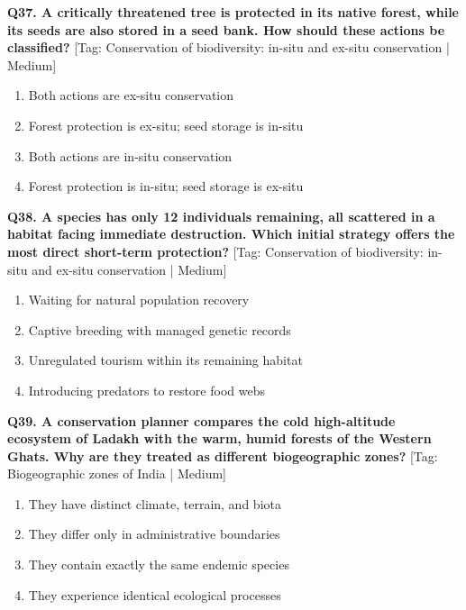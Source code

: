 \noindent\textbf{Q37. A critically threatened tree is protected in its native forest, while its seeds are also stored in a seed bank. How should these actions be classified?} \hfill [Tag: Conservation of biodiversity: in-situ and ex-situ conservation | Medium]
\begin{enumerate}[label=(\alph*),topsep=2pt,itemsep=1pt,partopsep=0pt,parsep=0pt]
    \item {Both actions are ex-situ conservation}
    \item {Forest protection is ex-situ; seed storage is in-situ}
    \item {Both actions are in-situ conservation}
    \item {Forest protection is in-situ; seed storage is ex-situ}
\end{enumerate}
\vspace{2mm}

\noindent\textbf{Q38. A species has only 12 individuals remaining, all scattered in a habitat facing immediate destruction. Which initial strategy offers the most direct short-term protection?} \hfill [Tag: Conservation of biodiversity: in-situ and ex-situ conservation | Medium]
\begin{enumerate}[label=(\alph*),topsep=2pt,itemsep=1pt,partopsep=0pt,parsep=0pt]
    \item {Waiting for natural population recovery}
    \item {Captive breeding with managed genetic records}
    \item {Unregulated tourism within its remaining habitat}
    \item {Introducing predators to restore food webs}
\end{enumerate}
\vspace{2mm}

\noindent\textbf{Q39. A conservation planner compares the cold high-altitude ecosystem of Ladakh with the warm, humid forests of the Western Ghats. Why are they treated as different biogeographic zones?} \hfill [Tag: Biogeographic zones of India | Medium]
\begin{enumerate}[label=(\alph*),topsep=2pt,itemsep=1pt,partopsep=0pt,parsep=0pt]
    \item {They have distinct climate, terrain, and biota}
    \item {They differ only in administrative boundaries}
    \item {They contain exactly the same endemic species}
    \item {They experience identical ecological processes}
\end{enumerate}
\vspace{2mm}

